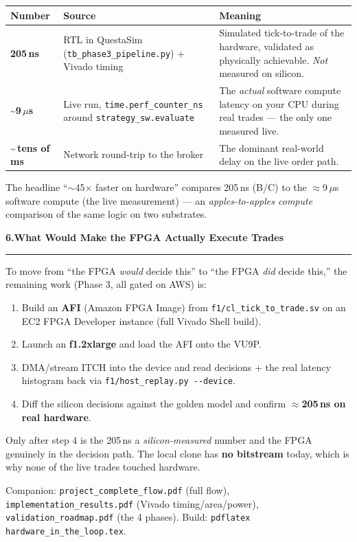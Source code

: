 \documentclass[10pt,a4paper]{article}
\newcommand{\sectionrule}{\par\nobreak\vspace{1pt}\textcolor{rulegray}{\rule{\linewidth}{0.8pt}}\par\vspace{1pt}}
\newcommand{\fpath}[1]{\texttt{\textcolor{hdrblue}{#1}}}
\begin{document}
\begin{center}\small
\renewcommand{\arraystretch}{1.3}
\begin{tabularx}{\linewidth}{@{}l l X@{}}
\toprule
\textbf{Number} & \textbf{Source} & \textbf{Meaning} \\
\midrule
\textbf{205\,ns} & RTL in QuestaSim (\fpath{tb\_phase3\_pipeline.py}) + Vivado timing
  & Simulated tick-to-trade of the hardware, validated as physically achievable. \emph{Not} measured on silicon. \\
\textbf{\textasciitilde9\,$\mu$s} & Live run, \fpath{time.perf\_counter\_ns} around \fpath{strategy\_sw.evaluate}
  & The \emph{actual} software compute latency on your CPU during real trades --- the only one measured live. \\
\textbf{\textasciitilde$\,$tens of ms} & Network round-trip to the broker
  & The dominant real-world delay on the live order path. \\
\bottomrule
\end{tabularx}
\end{center}

The headline ``$\sim$45$\times$ faster on hardware'' compares 205\,ns (B/C) to the
$\approx$9\,$\mu$s software compute (the live measurement) --- an
\emph{apples-to-apples compute} comparison of the same logic on two substrates.

{\large\bfseries\color{hdrblue} 6.\quad What Would Make the FPGA Actually Execute Trades}
\sectionrule

\begin{okboxx}
To move from ``the FPGA \emph{would} decide this'' to ``the FPGA \emph{did} decide
this,'' the remaining work (Phase 3, all gated on AWS) is:
\begin{enumerate}[leftmargin=1.5em, topsep=2pt, itemsep=1pt]
\item Build an \textbf{AFI} (Amazon FPGA Image) from \fpath{f1/cl\_tick\_to\_trade.sv}
      on an EC2 FPGA Developer instance (full Vivado Shell build).
\item Launch an \textbf{f1.2xlarge} and load the AFI onto the VU9P.
\item DMA/stream ITCH into the device and read decisions + the real latency
      histogram back via \fpath{f1/host\_replay.py -{}-device}.
\item Diff the silicon decisions against the golden model and confirm
      \textbf{$\approx$205\,ns on real hardware}.
\end{enumerate}
Only after step 4 is the 205\,ns a \emph{silicon-measured} number and the FPGA
genuinely in the decision path. The local clone has \textbf{no bitstream} today,
which is why none of the live trades touched hardware.
\end{okboxx}

\vfill
{\small\color{rulegray} Companion: \fpath{project\_complete\_flow.pdf} (full
flow), \fpath{implementation\_results.pdf} (Vivado timing/area/power),
\fpath{validation\_roadmap.pdf} (the 4 phases). Build:
\texttt{pdflatex hardware\_in\_the\_loop.tex}.}
\end{document}
